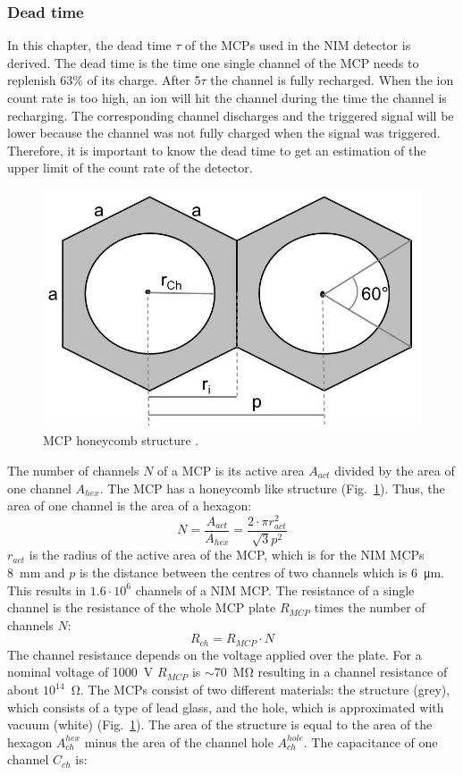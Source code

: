 	
	\subsubsection{Dead time}
	In this chapter, the dead time $\tau$ of the MCPs used in the NIM detector is derived. The dead time is the time one single channel of the MCP needs to replenish 63\% of its charge. After 5$\tau$ the channel is fully recharged. When the ion count rate is too high, an ion will hit the channel during the time the channel is recharging. The corresponding channel discharges and the triggered signal will be lower because the channel was not fully charged when the signal was triggered. Therefore, it is important to know the dead time to get an estimation of the upper limit of the count rate of the detector.\\
	\begin{figure}[H]
		\centering
		\includegraphics[width=.4\textwidth]{Bilder/MCP_hex.jpg}
		\caption{MCP honeycomb structure \cite{Diss_Neuland}.}
		\label{fig:MCPhex}
	\end{figure}
	The number of channels $N$ of a MCP is its active area $A_{act}$ divided by the area of one channel $A_{hex}$. The MCP has a honeycomb like structure (Fig.~\ref{fig:MCPhex}). Thus, the area of one channel is the area of a hexagon:
	\begin{equation}
		N = \frac{A_{act}}{A_{hex}} = \frac{2\cdot\pi r^2_{act}}{\sqrt{3}p^2}
	\end{equation}
	$r_{act}$ is the radius of the active area of the MCP, which is for the NIM MCPs 8~mm and $p$ is the distance between the centres of two channels which is 6~\si{\micro\meter}. This results in $1.6\cdot10^6$ channels of a NIM MCP. The resistance of a single channel is the resistance of the whole MCP plate $R_{MCP}$ times the number of channels $N$:
	\begin{equation}
		R_{ch} = R_{MCP}\cdot N
	\end{equation}
	The channel resistance depends on the voltage applied over the plate. For a nominal voltage of 1000~\si{\volt} $R_{MCP}$ is $\sim$70~\si{\mega\ohm} resulting in a channel resistance of about $10^{14}$~\si{\ohm}. The MCPs consist of two different materials: the structure (grey), which consists of a type of lead glass, and the hole, which is approximated with vacuum (white) (Fig.~\ref{fig:MCPhex}). The area of the structure is equal to the area of the hexagon $A^{hex}_{ch}$ minus the area of the channel hole $A^{hole}_{ch}$. The capacitance of one channel $C_{ch}$ is:
